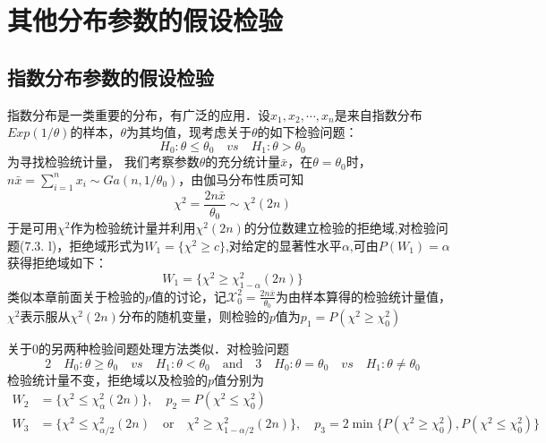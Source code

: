 \section{其他分布参数的假设检验}
\subsection{指数分布参数的假设检验}
指数分布是一类重要的分布，有广泛的应用．设$x_1,x_2,\cdots,x_n$是来自指数分布$Exp(1/\theta)$的样本，$\theta$为其均值，现考虑关于$\theta$的如下检验问题：
\begin{equation}
    H_0:\theta \leq \theta_0 \quad vs \quad H_1:\theta > \theta_0
\end{equation}
为寻找检验统计量， 我们考察参数$\theta$的充分统计量$\bar{x}$，在$\theta=\theta_0$时，$n \bar{x}=\sum_{i=1}^nx_i\sim Ga(n,1/\theta_0)$，由伽马分布性质可知
\begin{equation}
    \chi^2=\frac{2n\bar{x}}{\theta_0}\sim \chi^2(2n)
\end{equation}
于是可用$\chi^2$作为检验统计量并利用$\chi^2(2n)$的分位数建立检验的拒绝域,对检验问题(7.3. l)，拒绝域形式为$W_1=\{\chi^2 \geq c\}$,对给定的显著性水平$\alpha$,可由$P(W_1)=\alpha$获得拒绝域如下：
\begin{equation}
    W_1=\{\chi^2 \geq \chi_{1-\alpha}^2(2n)\}
\end{equation}
类似本章前面关于检验的$p$值的讨论，记${\mathcal X}_{0}^{2}=\frac{2n\overline{x}}{\theta_{0}}$为由样本算得的检验统计量值，$\chi^2$表示服从$\chi^2(2n)$分布的随机变量，则检验的$p$值为$p_1=P(\chi^2 \geq \chi_0^2)$

关于0的另两种检验间题处理方法类似．对检验问题
$$
    2\quad H_0:\theta \geq \theta_0 \quad vs \quad H_1:\theta < \theta_0 \quad \text{and} \quad 3 \quad H_0:\theta = \theta_0 \quad vs \quad H_1:\theta \neq \theta_0
$$
检验统计量不变，拒绝域以及检验的$p$值分别为
$$
    \begin{aligned}
        W_2 & = \{\chi^2 \leq \chi_{\alpha}^2(2n)\}, \quad p_2 = P(\chi^2 \leq \chi_0^2)                                                                                              \\
        W_3 & = \{\chi^2 \leq \chi_{\alpha/2}^2(2n) \quad \text{or} \quad \chi^2 \geq \chi_{1-\alpha/2}^2(2n)\}, \quad p_3 = 2\min\{P(\chi^2 \geq \chi_0^2),P(\chi^2 \leq \chi_0^2)\}
    \end{aligned}
$$

